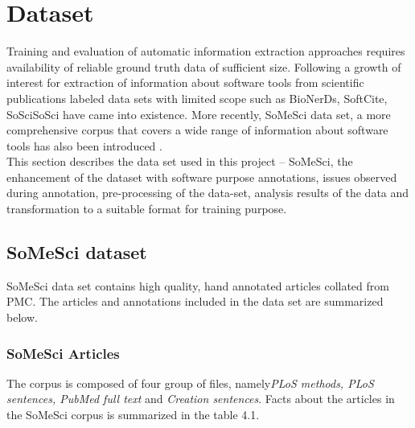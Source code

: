 \chapter{Dataset}
\label{ch:dataset}
 
%
%

Training and evaluation of automatic information extraction approaches requires availability of reliable ground truth data of sufficient size. Following a growth of interest for extraction of information about software tools from scientific publications labeled data sets with limited scope such as BioNerDs, SoftCite, SoSciSoSci have came into existence. More recently, \ac{SoMeSci} data set, a more comprehensive corpus that covers a wide range of information about software tools has also been introduced \citep{schindler2021somesci}.  \\

This section describes the data set used in this project – \ac{SoMeSci},  the enhancement of the dataset with software purpose annotations, issues observed during annotation, pre-processing of the data-set, analysis results of the data and transformation to a suitable format for training purpose.  


\section{SoMeSci dataset}
\label{sec:dataset:SoMeSci}

\ac{SoMeSci} data set contains high quality, hand annotated articles collated from  \ac{PMC}. The articles and annotations included in the data set are summarized below.  

\subsection{ SoMeSci Articles }
\label{subsec:dataset:SoMeSci:Articles}

The corpus is composed of four group of files, namely\emph{PLoS methods, PLoS sentences, PubMed full text} and \emph{Creation sentences}. Facts about the articles in the \ac{SoMeSci} corpus is summarized in the table 4.1. \\

